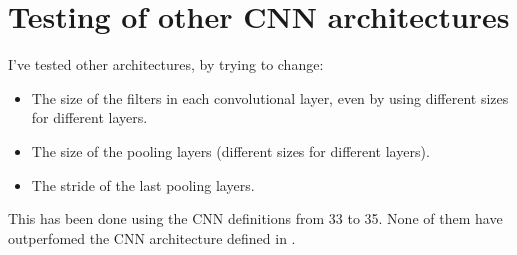 \section{Testing of other CNN architectures}\label{sec:cnnarch}

I've tested other architectures, by trying to change:
\begin{itemize}
	\item The size of the filters in each convolutional layer, even by
		using different sizes for different layers.
	\item The size of the pooling layers (different sizes for different
		layers).
	\item The stride of the last pooling layers.
\end{itemize}

This has been done using the CNN definitions from 33 to 35. None of them have
outperfomed the CNN architecture defined in .
